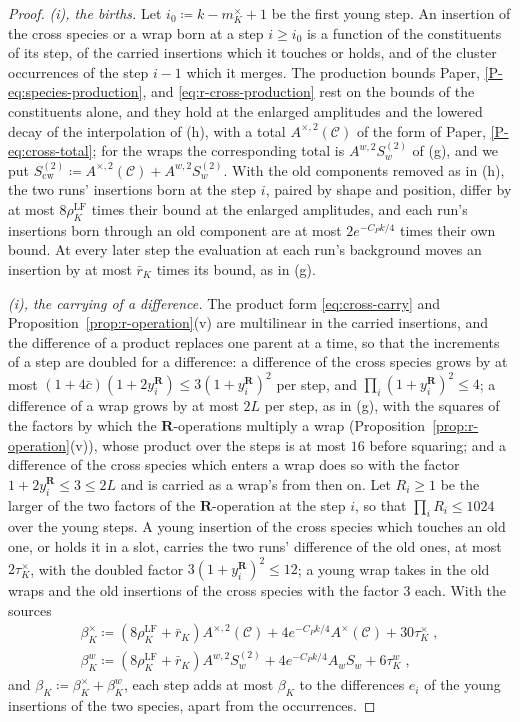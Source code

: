 \documentclass[11pt]{preprint}
\numberwithin{equation}{section}
\theoremstyle{definition}
\theoremstyle{remark}
\theoremstyle{plain}
\begin{document}
\begin{proof}
\emph{(i), the births.} Let $i_0 \coloneqq k - m^\times_K + 1$ be the first young step. An insertion of the cross species or a wrap born at a step $i \geq i_0$ is a function of the constituents of its step, of the carried insertions which it touches or holds, and of the cluster occurrences of the step $i - 1$ which it merges. The production bounds Paper, \eqref{P-eq:species-production}, and \eqref{eq:r-cross-production} rest on the bounds of the constituents alone, and they hold at the enlarged amplitudes and the lowered decay of the interpolation of (h), with a total $A^{\times,2}(\mathcal C)$ of the form of Paper, \eqref{P-eq:cross-total}; for the wraps the corresponding total is $A^{w,2}S^{(2)}_w$ of (g), and we put $S^{(2)}_{\mathrm{cw}} \coloneqq A^{\times,2}(\mathcal C) + A^{w,2}S^{(2)}_w$. With the old components removed as in (h), the two runs' insertions born at the step $i$, paired by shape and position, differ by at most $8\rho^{\mathrm{LF}}_K$ times their bound at the enlarged amplitudes, and each run's insertions born through an old component are at most $2e^{-C_Pk/4}$ times their own bound. At every later step the evaluation at each run's background moves an insertion by at most $\bar r_K$ times its bound, as in (g).

\emph{(i), the carrying of a difference.} The product form \eqref{eq:cross-carry} and Proposition~\ref{prop:r-operation}(v) are multilinear in the carried insertions, and the difference of a product replaces one parent at a time, so that the increments of a step are doubled for a difference: a difference of the cross species grows by at most $(1 + 4\bar c)(1 + 2y^{\mathbf R}_i) \leq 3(1 + y^{\mathbf R}_i)^2$ per step, and $\prod_i(1 + y^{\mathbf R}_i)^2 \leq 4$; a difference of a wrap grows by at most $2L$ per step, as in (g), with the squares of the factors by which the $\mathbf R$-operations multiply a wrap (Proposition~\ref{prop:r-operation}(v)), whose product over the steps is at most $16$ before squaring; and a difference of the cross species which enters a wrap does so with the factor $1 + 2y^{\mathbf R}_i \leq 3 \leq 2L$ and is carried as a wrap's from then on. Let $R_i \geq 1$ be the larger of the two factors of the $\mathbf R$-operation at the step $i$, so that $\prod_iR_i \leq 1024$ over the young steps. A young insertion of the cross species which touches an old one, or holds it in a slot, carries the two runs' difference of the old ones, at most $2\tau^\times_K$, with the doubled factor $3(1 + y^{\mathbf R}_i)^2 \leq 12$; a young wrap takes in the old wraps and the old insertions of the cross species with the factor $3$ each. With the sources
\begin{gather*}
    \beta^\times_K \coloneqq (8\rho^{\mathrm{LF}}_K + \bar r_K)A^{\times,2}(\mathcal C) + 4e^{-C_Pk/4}A^\times(\mathcal C) + 30\tau^\times_K\;,\\
    \beta^w_K \coloneqq (8\rho^{\mathrm{LF}}_K + \bar r_K)A^{w,2}S^{(2)}_w + 4e^{-C_Pk/4}A_wS_w + 6\tau^w_K\;,
\end{gather*}
and $\beta_K \coloneqq \beta^\times_K + \beta^w_K$, each step adds at most $\beta_K$ to the differences $e_i$ of the young insertions of the two species, apart from the occurrences.


\end{proof}
\end{document}
